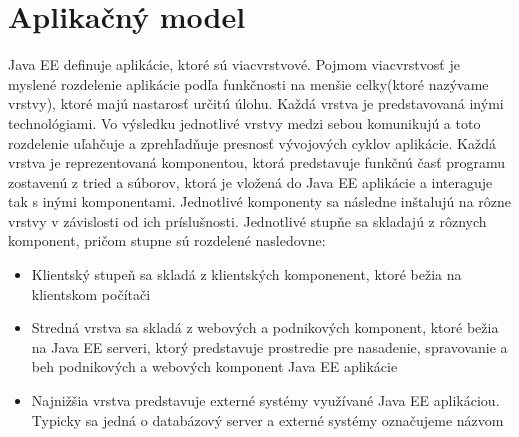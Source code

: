 \section{Aplikačný model}\label{kapapp}
Java EE definuje aplikácie, ktoré sú viacvrstvové. Pojmom viacvrstvosť je myslené rozdelenie aplikácie podľa funkčnosti na menšie celky(ktoré nazývame vrstvy), ktoré majú nastarosť určitú úlohu. Každá vrstva je predstavovaná inými technológiami. Vo výsledku jednotlivé vrstvy medzi sebou komunikujú a toto rozdelenie uľahčuje a zprehľadňuje presnosť vývojových cyklov aplikácie. Každá vrstva je reprezentovaná komponentou, ktorá predstavuje funkčnú časť programu zostavenú z tried a súborov, ktorá je vložená do Java EE aplikácie a interaguje tak s inými komponentami\cite{Pravidla}. Jednotlivé komponenty sa následne inštalujú na rôzne vrstvy v závislosti od ich príslušnosti. Jednotlivé stupňe sa skladajú z rôznych komponent, pričom stupne sú rozdelené nasledovne:
\begin{itemize}
\item Klientský stupeň sa skladá z klientských komponenent, ktoré bežia na klientskom počítači
\item Stredná vrstva sa skladá z webových a podnikových komponent, ktoré bežia na Java EE serveri, ktorý predstavuje prostredie pre nasadenie, spravovanie a beh podnikových a webových komponent Java EE aplikácie
\item Najnižšia vrstva predstavuje externé systémy využívané Java EE aplikáciou. Typicky sa jedná o databázový server a externé systémy označujeme názvom 
\end{itemize}

